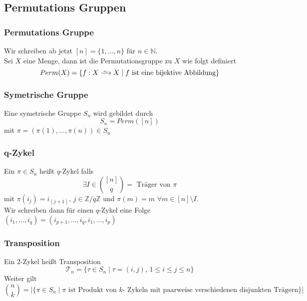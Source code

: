 \documentclass[12pt, german]{article}
\newcommand\iso{\xrightarrow{
		\,\smash{\raisebox{-0.65ex}{\ensuremath{\scriptstyle\sim}}}\,}}
\begin{document}
\subsection{Permutations Gruppen}
\subsubsection{Permutations Gruppe}
		Wir schreiben ab jetzt $[n] = \{1, \ldots, n\}$ für $n \in \mathbb N$.  \\ 
		\newline
		Sei $X$ eine Menge, dann ist die Permutationsgruppe zu $X$ wie folgt definiert 
		$$Perm(X)= \{ f: X \iso X \mid f \text{ ist eine bijektive Abbildung}\}$$

\subsubsection{Symetrische Gruppe}
Eine symetrische Gruppe $S_n$ wird gebildet durch $$S_n = Perm([n])$$ mit $\pi = (\pi(1), \ldots, \pi(n)) \in S_n$

\subsubsection{q-Zykel}
	Ein $\pi \in S_n$ heißt $q$-Zykel falls $$ \exists I \in \binom{[n]}{q} = \text{ Träger von $\pi$}$$ mit $\pi(i_j) = i_{(j+1)}, \, j \in \mathbb Z / q \mathbb Z$ und $\pi(m)= m$ $\forall m \in [n]  \setminus  I$. \\ 
	Wir schreiben dann für einen $q$-Zykel eine Folge $(i_1, \ldots, i_q) = (i_{p+1}, \ldots, i_q, i_1, \ldots, i_p)$

\subsubsection{Transposition}
	Ein $2$-Zykel heißt Transposition $$\mathcal T_n = \{ \tau \in S_n  \mid \tau = (i, j), \, 1 \leq i \leq j \leq n\}$$
	Weiter gilt $$\binom{n}{k} = |\{ \pi \in S_n \mid \pi \text{ ist Produkt von $k$- Zykeln  mit paarweise verschiedenen disjunkten Trägern} \}|$$
\end{document}
